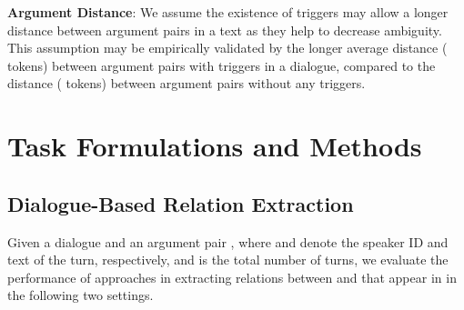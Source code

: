 \documentclass[11pt,a4paper]{article}
\begin{document}
\medskip

\noindent \textbf{Argument Distance}: We assume the existence of triggers may allow a longer distance between argument pairs in a text as they help to decrease ambiguity. This assumption may be empirically validated by the longer average distance ( tokens) between argument pairs with triggers in a dialogue, compared to the distance ( tokens) between argument pairs without any triggers. 











































































 
\section{Task Formulations and Methods}
\label{sec:task}


\subsection{Dialogue-Based Relation Extraction}
\label{sec:evaluation_metrics}


Given a dialogue  and an argument pair , where  and  denote the speaker ID and text of the  turn, respectively, and  is the total number of turns, we evaluate the performance of approaches in extracting relations between  and  that appear in  in the following two settings.
\end{document}
